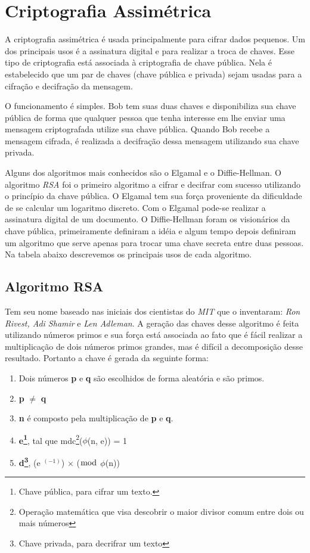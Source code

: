 %
\section{Criptografia Assimétrica}
\label{assymmetric-cryptography}

%
A criptografia assimétrica é usada principalmente para cifrar dados pequenos. Um dos principais usos é a assinatura digital e para realizar a troca de chaves. Esse tipo de criptografia está associada à criptografia de chave pública. Nela é estabelecido que um par de chaves (chave pública e privada) sejam usadas para a cifração e decifração da mensagem. 

%
O funcionamento é simples. Bob tem suas duas chaves e disponibiliza sua chave pública de forma que qualquer pessoa que tenha interesse em lhe enviar uma mensagem criptografada utilize sua chave pública. Quando Bob recebe a mensagem cifrada, é realizada a decifração dessa mensagem utilizando sua chave privada.

%
Alguns dos algoritmos mais conhecidos são o Elgamal e o Diffie-Hellman. O algoritmo \textit{RSA} foi o primeiro algoritmo a cifrar e decifrar com sucesso utilizando o princípio da chave pública. O Elgamal tem sua força proveniente da dificuldade de se calcular um logaritmo discreto. Com o Elgamal pode-se realizar a assinatura digital de um documento. O Diffie-Hellman foram os visionários da chave pública, primeiramente definiram a idéia e algum tempo depois definiram um algoritmo que serve apenas para trocar uma chave secreta entre duas pessoas.  Na tabela abaixo descrevemos os principais usos de cada algoritmo. 



\subsection{Algoritmo RSA}
\label{algorithm-rsa}

Tem seu nome baseado nas iniciais dos cientistas do \textit{MIT} que o inventaram: \textit{Ron Rivest, Adi Shamir} e \textit{Len Adleman}. A geração das chaves desse algoritmo é feita utilizando números primos e sua força está associada ao fato que é fácil realizar a multiplicação de dois números primos grandes, mas é difícil a decomposição desse resultado. Portanto a chave é gerada da seguinte forma:

\begin{enumerate}
\item Dois números \textbf{p} e \textbf{q} são escolhidos de forma aleatória e são primos.
\item \textbf{p} $\neq$ \textbf{q}
\item \textbf{n} é composto pela multiplicação de \textbf{p} e \textbf{q}.
\item \textbf{e\footnote{Chave pública, para cifrar um texto.}}, tal que mdc\footnote{Operação matemática que visa descobrir o maior divisor comum entre dois ou mais números}($\phi$(n, e)) = 1
\item \textbf{d\footnote{Chave privada, para decrifrar um texto }}, (e $^ {(-1)}$) $\times$ ($\bmod$ $\phi$(n)) 
\end{enumerate}

